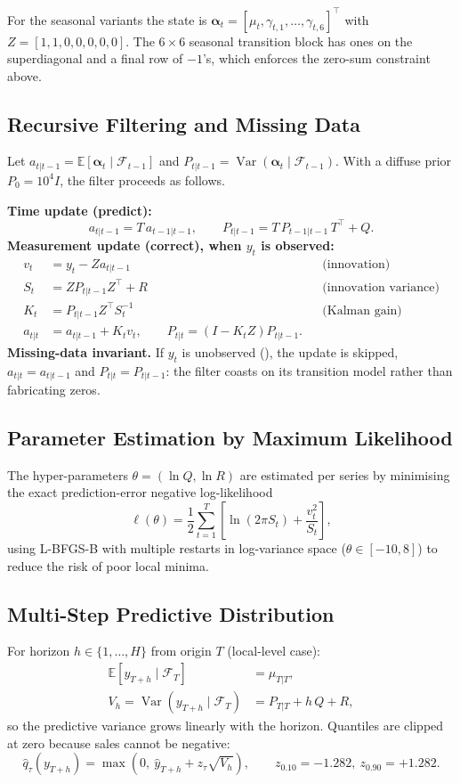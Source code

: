 \documentclass[11pt,a4paper]{article}
\DeclareRobustCommand{\code}[1]{\texttt{\detokenize{#1}}}
\newcommand{\E}{\mathbb{E}}
\newcommand{\Var}{\operatorname{Var}}
\begin{document}
For the seasonal variants the state is $\boldsymbol\alpha_t=[\mu_t,\gamma_{t,1},\dots,\gamma_{t,6}]^\top$ with $Z=[1,1,0,0,0,0,0]$. The $6\times6$ seasonal transition block has ones on the superdiagonal and a final row of $-1$'s, which enforces the zero-sum constraint above.

\subsection{Recursive Filtering and Missing Data}
Let $a_{t|t-1}=\E[\boldsymbol\alpha_t\mid\mathcal F_{t-1}]$ and $P_{t|t-1}=\Var(\boldsymbol\alpha_t\mid\mathcal F_{t-1})$. With a diffuse prior $P_0=10^{4}I$, the filter proceeds as follows.

\textbf{Time update (predict):}
\begin{equation}
  a_{t|t-1}=T\,a_{t-1|t-1},\qquad P_{t|t-1}=T\,P_{t-1|t-1}\,T^\top+Q.
\end{equation}
\textbf{Measurement update (correct), when $y_t$ is observed:}
\begin{align}
  v_t &= y_t - Z a_{t|t-1} && \text{(innovation)}\\
  S_t &= Z P_{t|t-1} Z^\top + R && \text{(innovation variance)}\\
  K_t &= P_{t|t-1} Z^\top S_t^{-1} && \text{(Kalman gain)}\\
  a_{t|t} &= a_{t|t-1} + K_t v_t,\qquad P_{t|t}=(I-K_tZ)P_{t|t-1}.
\end{align}
\textbf{Missing-data invariant.} If $y_t$ is unobserved (\code{NaN}), the update is skipped, $a_{t|t}=a_{t|t-1}$ and $P_{t|t}=P_{t|t-1}$: the filter coasts on its transition model rather than fabricating zeros.

\subsection{Parameter Estimation by Maximum Likelihood}
The hyper-parameters $\theta=(\ln Q,\ln R)$ are estimated per series by minimising the exact prediction-error negative log-likelihood
\begin{equation}
  \ell(\theta)=\frac12\sum_{t=1}^{T}\left[\ln(2\pi S_t)+\frac{v_t^{2}}{S_t}\right],
\end{equation}
using L-BFGS-B with multiple restarts in log-variance space ($\theta\in[-10,8]$) to reduce the risk of poor local minima.

\subsection{Multi-Step Predictive Distribution}
For horizon $h\in\{1,\dots,H\}$ from origin $T$ (local-level case):
\begin{align}
  \E[y_{T+h}\mid\mathcal F_T] &= \mu_{T|T},\\
  V_h=\Var(y_{T+h}\mid\mathcal F_T) &= P_{T|T}+h\,Q+R,
\end{align}
so the predictive variance grows linearly with the horizon. Quantiles are clipped at zero because sales cannot be negative:
\begin{equation}
  \hat q_\tau(y_{T+h})=\max\!\left(0,\ \hat y_{T+h}+z_\tau\sqrt{V_h}\right),\qquad z_{0.10}=-1.282,\ z_{0.90}=+1.282.
\end{equation}
\end{document}
